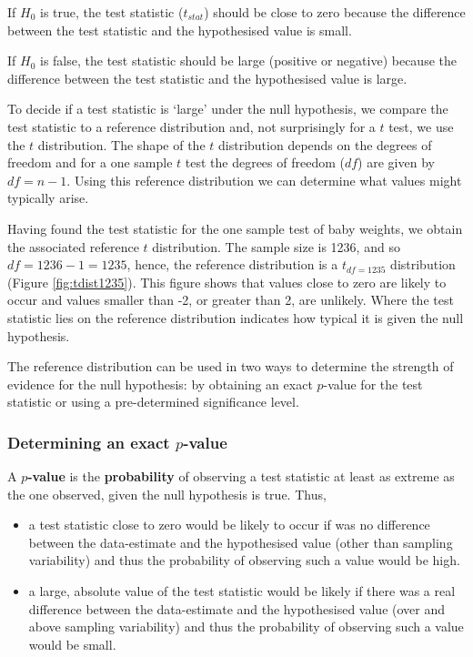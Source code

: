 \documentclass[
  oneside]{krantz}
\begin{document}
If \(H_0\) is true, the test statistic (\(t_{stat}\)) should be close to zero because the difference between the test statistic and the hypothesised value is small.

If \(H_0\) is false, the test statistic should be large (positive or negative) because the difference between the test statistic and the hypothesised value is large.

To decide if a test statistic is `large' under the null hypothesis, we compare the test statistic to a reference distribution and, not surprisingly for a \(t\) test, we use the \(t\) distribution. The shape of the \(t\) distribution depends on the degrees of freedom and for a one sample \(t\) test the degrees of freedom (\(df\)) are given by \(df = n - 1\). Using this reference distribution we can determine what values might typically arise.

Having found the test statistic for the one sample test of baby weights, we obtain the associated reference \(t\) distribution. The sample size is 1236, and so \(df = 1236 - 1 = 1235\), hence, the reference distribution is a \(t_{df=1235}\) distribution (Figure \ref{fig:tdist1235}). This figure shows that values close to zero are likely to occur and values smaller than -2, or greater than 2, are unlikely. Where the test statistic lies on the reference distribution indicates how typical it is given the null hypothesis.

The reference distribution can be used in two ways to determine the strength of evidence for the null hypothesis: by obtaining an exact \(p\)-value for the test statistic or using a pre-determined significance level.

\hypertarget{determining-an-exact-p-value}{%
\subsubsection{\texorpdfstring{Determining an exact \(p\)-value}{Determining an exact p-value}}\label{determining-an-exact-p-value}}

A \textbf{\(p\)-value} is the \textbf{probability} of observing a test statistic at least as extreme as the one observed, given the null hypothesis is true. Thus,

\begin{itemize}
\item
  a test statistic close to zero would be likely to occur if was no difference between the data-estimate and the hypothesised value (other than sampling variability) and thus the probability of observing such a value would be high.
\item
  a large, absolute value of the test statistic would be likely if there was a real difference between the data-estimate and the hypothesised value (over and above sampling variability) and thus the probability of observing such a value would be small.
\end{itemize}
\end{document}
